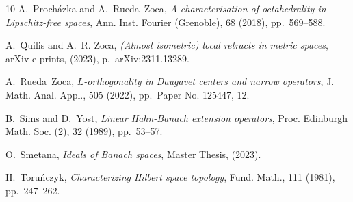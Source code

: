 \documentclass[11pt]{amsart}
\theoremstyle{definition}
\theoremstyle{remark}
\begin{document}
\begin{thebibliography}{10}
{\sc A.~Proch\'{a}zka and A.~Rueda~Zoca}, {\em A characterisation of
  octahedrality in {L}ipschitz-free spaces}, Ann. Inst. Fourier (Grenoble), 68
  (2018), pp.~569--588.

{\sc A.~Quilis and A.~R. Zoca}, {\em ({A}lmost isometric) local retracts in
  metric spaces}, arXiv e-prints,  (2023), p.~arXiv:2311.13289.

{\sc A.~Rueda~Zoca}, {\em {$L$}-orthogonality in {D}augavet centers and narrow
  operators}, J. Math. Anal. Appl., 505 (2022), pp.~Paper No. 125447, 12.

{\sc B.~Sims and D.~Yost}, {\em Linear {H}ahn-{B}anach extension operators},
  Proc. Edinburgh Math. Soc. (2), 32 (1989), pp.~53--57.

{\sc O.~Smetana}, {\em Ideals of {B}anach spaces}, Master Thesis,  (2023).

{\sc H.~Toru\'{n}czyk}, {\em Characterizing {H}ilbert space topology}, Fund.
  Math., 111 (1981), pp.~247--262.

\end{thebibliography}
\end{document}
